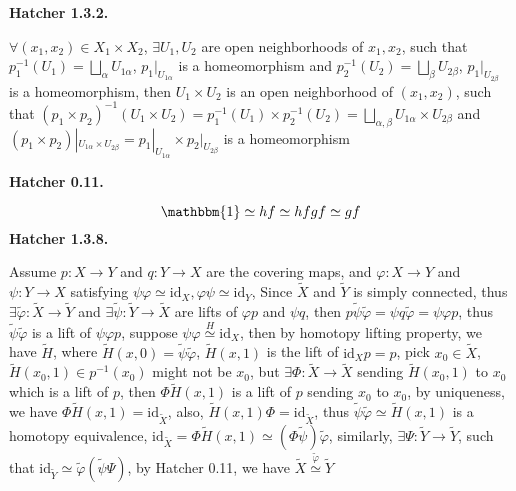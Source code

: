 \documentclass[../main.tex]{subfiles}
\begin{document}
\textbf{Hatcher 1.3.2.} \par
$\forall (x_{1},x_{2})\in X_{1}\times X_{2}$, $\exists U_{1},U_{2}$ are open neighborhoods of $x_{1},x_{2}$, such that $p_{1}^{-1}(U_{1})=\displaystyle\bigsqcup_\alpha U_{1\alpha}$, $p_{1}|_{U_{1\alpha}}$ is a homeomorphism and $p_{2}^{-1}(U_{2})=\displaystyle\bigsqcup_\beta U_{2\beta}$, $p_{1}|_{U_{2\beta}}$ is a homeomorphism, then $U_{1}\times U_{2}$ is an open neighborhood of $(x_{1},x_{2})$, such that $(p_{1}\times p_{2})^{-1}(U_{1}\times U_{2})=p_{1}^{-1}(U_{1})\times p_{2}^{-1}(U_{2})=\displaystyle\bigsqcup_{\alpha,\beta}U_{1\alpha}\times U_{2\beta}$ and $(p_{1}\times p_{2})|_{U_{1\alpha}\times U_{2\beta}}=p_{1}|_{U_{1\alpha}}\times p_{2}|_{U_{2\beta}}$ is a homeomorphism \par
\textbf{Hatcher 0.11.} \par
$$\mathbbm{1}\simeq hf\simeq hfgf\simeq gf$$
\textbf{Hatcher 1.3.8.} \par
Assume $p: X\rightarrow Y$ and $q: Y\rightarrow X$ are the covering maps, and $\varphi: X\rightarrow Y$ and $\psi: Y\rightarrow X$ satisfying $\psi\varphi\simeq\mathrm{id}_X, \varphi\psi\simeq\mathrm{id}_Y$, Since $\widetilde{X}$ and $\widetilde{Y}$ is simply connected, thus $\exists \widetilde{\varphi}: \widetilde{X}\rightarrow \widetilde{Y}$ and $\exists \widetilde{\psi}: \widetilde{Y}\rightarrow \widetilde{X}$ are lifts of $\varphi p$ and $\psi q$, then $p\widetilde{\psi}\widetilde{\varphi}=\psi q\widetilde{\varphi}=\psi\varphi p$, thus $\widetilde{\psi}\widetilde{\varphi}$ is a lift of $\psi\varphi p$, suppose $\psi\varphi\overset{H}{\simeq}\mathrm{id}_X$, then by homotopy lifting property, we have $\widetilde{H}$, where $\widetilde{H}(x,0)=\widetilde{\psi}\widetilde{\varphi}$, $\widetilde{H}(x,1)$ is the lift of $\mathrm{id}_X p=p$, pick $x_0\in\widetilde{X}$, $\widetilde{H}(x_0,1)\in p^{-1}(x_0)$ might not be $x_0$, but $\exists \Phi: \widetilde{X}\rightarrow\widetilde{X}$ sending $\widetilde{H}(x_0,1)$ to $x_0$ which is a lift of $p$, then $\Phi\widetilde{H}(x,1)$ is a lift of $p$ sending $x_0$ to $x_0$, by uniqueness, we have $\Phi\widetilde{H}(x,1)=\mathrm{id}_{\widetilde{X}}$, also, $\widetilde{H}(x,1)\Phi=\mathrm{id}_{\widetilde{X}}$, thus $\widetilde{\psi}\widetilde{\varphi}\simeq\widetilde{H}(x,1)$ is a homotopy equivalence, $\mathrm{id}_{\widetilde{X}}=\Phi\widetilde{H}(x,1)\simeq\left(\Phi\widetilde{\psi}\right)\widetilde{\varphi}$, similarly, $\exists \Psi: \widetilde{Y}\rightarrow \widetilde{Y}$, such that $\mathrm{id}_{\widetilde{Y}}\simeq\widetilde{\varphi}\left(\widetilde{\psi}\Psi\right)$, by Hatcher 0.11, we have $\widetilde{X}\overset{\widetilde{\varphi}}{\simeq}\widetilde{Y}$ \par
\end{document}
